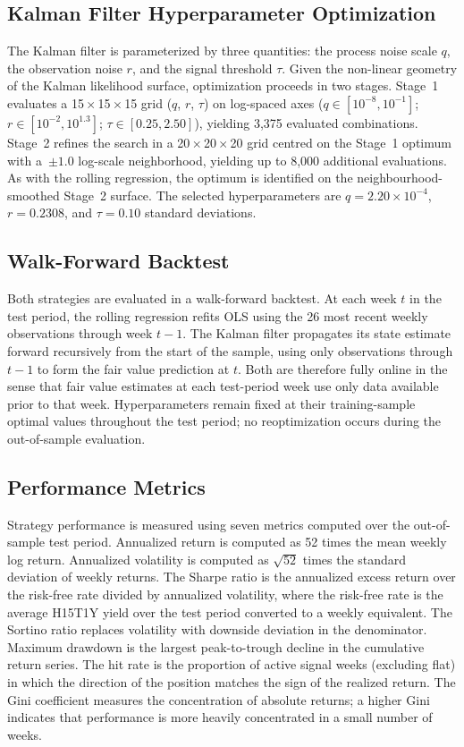 \documentclass[12pt]{article}
\begin{document}
\subsection{Kalman Filter Hyperparameter Optimization}

The Kalman filter is parameterized by three quantities: the process noise scale $q$, the observation noise $r$, and the signal threshold $\tau$. Given the non-linear geometry of the Kalman likelihood surface, optimization proceeds in two stages. Stage~1 evaluates a 15\,$\times$\,15\,$\times$\,15 grid ($q$, $r$, $\tau$) on log-spaced axes ($q \in [10^{-8}, 10^{-1}]$; $r \in [10^{-2}, 10^{1.3}]$; $\tau \in [0.25, 2.50]$), yielding 3,375 evaluated combinations. Stage~2 refines the search in a 20\,$\times$\,20\,$\times$\,20 grid centred on the Stage~1 optimum with a \,$\pm1.0$ log-scale neighborhood, yielding up to 8,000 additional evaluations. As with the rolling regression, the optimum is identified on the neighbourhood-smoothed Stage~2 surface. The selected hyperparameters are $q = 2.20 \times 10^{-4}$, $r = 0.2308$, and $\tau = 0.10$ standard deviations.

\subsection{Walk-Forward Backtest}

Both strategies are evaluated in a walk-forward backtest. At each week $t$ in the test period, the rolling regression refits OLS using the 26 most recent weekly observations through week $t-1$. The Kalman filter propagates its state estimate forward recursively from the start of the sample, using only observations through $t-1$ to form the fair value prediction at $t$. Both are therefore fully online in the sense that fair value estimates at each test-period week use only data available prior to that week. Hyperparameters remain fixed at their training-sample optimal values throughout the test period; no reoptimization occurs during the out-of-sample evaluation.

\subsection{Performance Metrics}

Strategy performance is measured using seven metrics computed over the out-of-sample test period. Annualized return is computed as 52 times the mean weekly log return. Annualized volatility is computed as $\sqrt{52}$ times the standard deviation of weekly returns. The Sharpe ratio is the annualized excess return over the risk-free rate divided by annualized volatility, where the risk-free rate is the average H15T1Y yield over the test period converted to a weekly equivalent. The Sortino ratio replaces volatility with downside deviation in the denominator. Maximum drawdown is the largest peak-to-trough decline in the cumulative return series. The hit rate is the proportion of active signal weeks (excluding flat) in which the direction of the position matches the sign of the realized return. The Gini coefficient measures the concentration of absolute returns; a higher Gini indicates that performance is more heavily concentrated in a small number of weeks.
\end{document}
